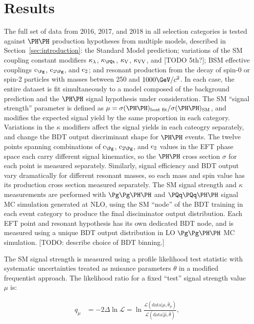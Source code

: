 \section{Results}
\label{sec:results}

The full set of data from 2016, 2017, and 2018 in all selection categories
is tested against $\HH$ production hypotheses from multiple models, described
in Section~\ref{sec:introduction}: the Standard Model prediction;
variations of the SM coupling constant modifiers
$\kappa_{\lambda}$, $\kappat$, $\kappa_{\textrm{V}}$, $\kappa_{\textrm{V}\textrm{V}}$, and [TODO 5th?];
BSM effective couplings $\cg$, $\cgg$, and $\text{c}_{2}$;
and resonant production from the decay of spin-0 or
spin-2 particles with masses between 250 and $1000\GeV/c^{2}$.
In each case, the entire dataset is fit simultaneously to a model
composed of the background prediction and the $\HH$ signal hypothesis
under consideration.  The SM ``signal strength'' parameter is defined as
$\mu = \sigma(\HH)_{\textrm{best fit}} / \sigma(\HH)_{\textrm{SM}}$,
and modifies the expected signal yield by the same proportion in each category.
Variations in the $\kappa$ modifiers affect the signal yields in each cateogry
separately, and change the BDT output discriminant shape for $\HH$ events.
The twelve points spanning combinations of $\cg$, $\cgg$, and $\text{c}_{2}$ values in
the EFT phase space each carry different signal kinematics, so the $\HH$ cross
section $\sigma$ for each point is measured separately.  Similarly, signal efficiency
and BDT output vary dramatically for different resonant masses, so each mass and
spin value has its production cross section measured separately.  The SM signal
strength and $\kappa$ measurements are performed with $\ggHH$ and $\qqHH$ signal
MC simulation generated at NLO, using the SM ``node'' of the BDT training in
each event category to produce the final disciminator output distribution.
Each EFT point and resonant hypothesis has its own dedicated BDT node, and
is measured using a unique BDT output distribution in LO $\ggHH$ MC simulation.
[TODO: describe choice of BDT binning.]

The SM signal strength is measured using a profile likelihood test
statistic%
with systematic uncertainties treated as
nuisance parameters $\theta$ in a modified frequentist
approach.%
The likelihood ratio for a fixed ``test'' signal strength value $\mu$ is:

\begin{linenomath}
\begin{equation*}
  \begin{aligned}
    q_{\mu}  &  = -2 \Delta \ln \mathcal{L} = \ln \frac{\mathcal{L}(\mathrm{data}|\mu,\hat{\theta}_{\mu})}{\mathcal{L}(\mathrm{data}|\hat{\mu},\hat{\theta})},
  \end{aligned}
\end{equation*}
\end{linenomath}

